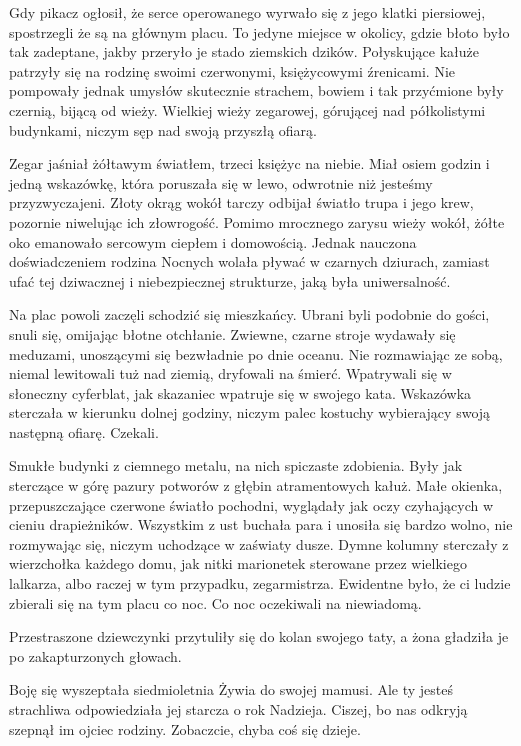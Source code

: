 Gdy pikacz ogłosił, że serce operowanego wyrwało się z jego klatki piersiowej, spostrzegli że są na głównym placu. 
To jedyne miejsce w okolicy, gdzie błoto było tak zadeptane, jakby przeryło je stado ziemskich dzików.
Połyskujące kałuże patrzyły się na rodzinę swoimi czerwonymi, księżycowymi źrenicami.
Nie pompowały jednak umysłów skutecznie strachem, bowiem i tak przyćmione były czernią, bijącą od wieży.
Wielkiej wieży zegarowej, górującej nad półkolistymi budynkami, niczym sęp nad swoją przyszłą ofiarą.

Zegar jaśniał żółtawym światłem, trzeci księżyc na niebie.
Miał osiem godzin i jedną wskazówkę, która poruszała się w lewo, odwrotnie niż jesteśmy przyzwyczajeni.
Złoty okrąg wokół tarczy odbijał światło trupa i jego krew, pozornie niwelując ich złowrogość.
Pomimo mrocznego zarysu wieży wokół, żółte oko emanowało sercowym ciepłem i domowością.
Jednak nauczona doświadczeniem rodzina Nocnych wolała pływać w czarnych dziurach, zamiast ufać tej dziwacznej i niebezpiecznej strukturze, jaką była uniwersalność.

Na plac powoli zaczęli schodzić się mieszkańcy.
Ubrani byli podobnie do gości, snuli się, omijając błotne otchłanie.
Zwiewne, czarne stroje wydawały się meduzami, unoszącymi się bezwładnie po dnie oceanu.
Nie rozmawiając ze sobą, niemal lewitowali tuż nad ziemią, dryfowali na śmierć.
Wpatrywali się w słoneczny cyferblat, jak skazaniec wpatruje się w swojego kata.
Wskazówka sterczała w kierunku dolnej godziny, niczym palec kostuchy wybierający swoją następną ofiarę.
Czekali.

Smukłe budynki z ciemnego metalu, na nich spiczaste zdobienia. 
Były jak sterczące w górę pazury potworów z głębin atramentowych kałuż.
Małe okienka, przepuszczające czerwone światło pochodni, wyglądały jak oczy czyhających w cieniu drapieżników.
Wszystkim z ust buchała para i unosiła się bardzo wolno, nie rozmywając się, niczym uchodzące w zaświaty dusze.
Dymne kolumny sterczały z wierzchołka każdego domu, jak nitki marionetek sterowane przez wielkiego lalkarza, albo raczej w tym przypadku, zegarmistrza.
Ewidentne było, że ci ludzie zbierali się na tym placu co noc.
Co noc oczekiwali na niewiadomą.

Przestraszone dziewczynki przytuliły się do kolan swojego taty, a żona gładziła je po zakapturzonych głowach.
\begin{dialogue}
	\ds{} Boję się \dm{} wyszeptała siedmioletnia Żywia do swojej mamusi.
	\ds{} Ale ty jesteś strachliwa \dm{} odpowiedziała jej starcza o rok Nadzieja.
	\ds{} Ciszej, bo nas odkryją \dm{} szepnął im ojciec rodziny. \dm{} Zobaczcie, chyba coś się dzieje.
\end{dialogue}

